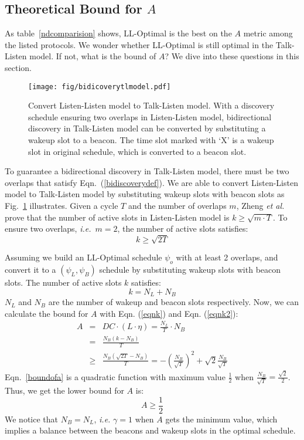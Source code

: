 \documentclass[conference]{IEEEtran}
\begin{document}
\subsection{Theoretical Bound for $A$}
As table~\ref{ndcomparision} shows, LL-Optimal is the best on the $A$ metric among the listed protocols.
We wonder whether LL-Optimal is still optimal in the Talk-Listen model.
If not, what is the bound of $A$?
We dive into these questions in this section.

\begin{figure}[t]
    \centering
    \texttt{[image: fig/bidicoverytlmodel.pdf]}
    \caption{Convert Listen-Listen model to Talk-Listen model.
    With a discovery schedule ensuring two overlaps in Listen-Listen model, 
    bidirectional discovery in Talk-Listen model can be converted by substituting a wakeup slot to a beacon.
    The time slot marked with `X' is a wakeup slot in original schedule, which is converted to a beacon slot.
}\label{bidicoverytlmodel}
\end{figure}

To guarantee a bidirectional discovery in Talk-Listen model, there must be two overlaps that satisfy Eqn.~(\ref{bidiscoverydef}).
We are able to convert Listen-Listen model to Talk-Listen model by substituting wakeup slots with beacon slots as Fig.~\ref{bidicoverytlmodel} illustrates.
Given a cycle $T$ and the number of overlaps $m$, 
Zheng \emph{et al.}~\cite{zheng2003asynchronous} prove that the number of active slots in Listen-Listen model is $k \geq \sqrt{m \cdot T}$.
To ensure two overlaps, \emph{i.e.}\ $m=2$, the number of active slots satisfies:
\begin{equation}\label{eqnk}
 k \geq \sqrt{2T}
\end{equation}

Assuming we build an LL-Optimal schedule $\psi_o$ with at least 2 overlaps, and convert it to a $(\psi_L, \psi_B)$ schedule by substituting wakeup slots with beacon slots.
The number of active slots $k$ satisfies:
\begin{equation}\label{eqnk2}
    k = N_L + N_B
\end{equation}
$N_L$ and $N_B$ are the number of wakeup and beacon slots respectively.
Now, we can calculate the bound for $A$ with Eqn. (\ref{eqnk}) and Eqn. (\ref{eqnk2}):
\begin{eqnarray}\label{boundofa}
    A & =    & DC \cdot (L \cdot \eta) = \frac{N_L}{T} \cdot N_B    \nonumber \\
      & =    & \frac{N_B (k - N_B)}{T}                              \nonumber \\
      & \geq & \frac{N_B (\sqrt{2T} - N_B)}{T}  =  -(\frac{N_B}{\sqrt{T}})^2 + \sqrt{2}\frac{N_B}{\sqrt{T}}
\end{eqnarray}
Eqn.~\ref{boundofa} is a quadratic function with maximum value $\frac{1}{2}$ when $\frac{N_B}{\sqrt{T}}=\frac{\sqrt{2}}{2}$.
Thus, we get the lower bound for $A$ is:
\begin{displaymath}
A \geq \frac{1}{2}
\end{displaymath}
We notice that $N_B=N_L$, \emph{i.e.} $\gamma=1$ when $A$ gets the minimum value,
which implies a balance between the beacons and wakeup slots in the optimal schedule.
\end{document}

